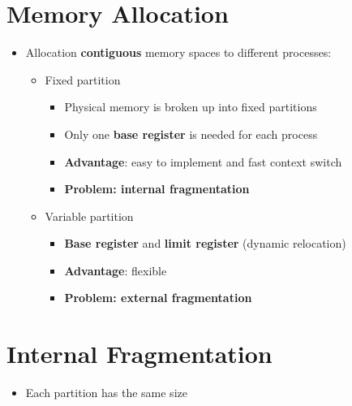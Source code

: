\documentclass[a4paper,11pt,english]{article}
\begin{document}
\section*{Memory Allocation}
\begin{itemize}
    \item Allocation \textbf{\color{blue} contiguous} memory spaces to different processes:
        \begin{itemize}
            \item Fixed partition
                \begin{itemize}
                    \item Physical memory is broken up into fixed partitions
                    \item Only one \textbf{\color{blue} base register} is needed for each process
                    \item \textbf{\color{blue} Advantage}: easy to implement and fast context switch
                    \item \textbf{\color{red} Problem: internal fragmentation}
                \end{itemize} 
            \item Variable partition
                \begin{itemize}
                    \item \textbf{\color{blue} Base register} and \textbf{\color{blue} limit register} (dynamic relocation)
                    \item \textbf{\color{blue} Advantage}: flexible
                    \item \textbf{\color{red} Problem: external fragmentation} 
                \end{itemize}
        \end{itemize}
\end{itemize}

\section*{Internal Fragmentation}
\begin{itemize}
    \item Each partition has the same size 
\end{itemize}
\end{document}
